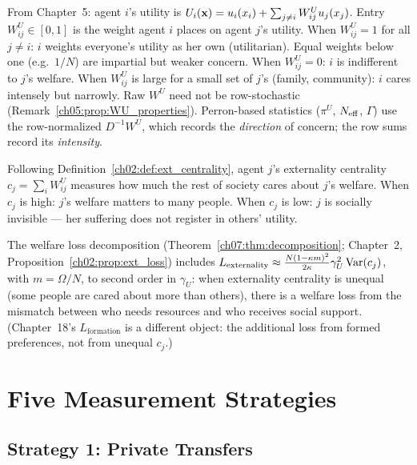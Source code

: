 \documentclass[../structural_economics_book.tex]{subfiles}
\begin{document}
\begin{definition}\label{ch22:def:recall}
From Chapter~5: agent $i$'s utility is $U_i(\mathbf{x}) = u_i(x_i) + \sum_{j \neq i} W^U_{ij} u_j(x_j)$. Entry $W^U_{ij} \in [0, 1]$ is the weight agent $i$ places on agent $j$'s utility. When $W^U_{ij} = 1$ for all $j \ne i$: $i$ weights everyone's utility as her own (utilitarian). Equal weights below one (e.g.\ $1/N$) are impartial but weaker concern. When $W^U_{ij} = 0$: $i$ is indifferent to $j$'s welfare. When $W^U_{ij}$ is large for a small set of $j$'s (family, community): $i$ cares intensely but narrowly. Raw $W^U$ need not be row-stochastic (Remark~\ref{ch05:prop:WU_properties}). Perron-based statistics ($\pi^U$, $N_{\text{eff}}$, $\Gamma$) use the row-normalized $D^{-1}W^U$, which records the \emph{direction} of concern; the row sums record its \emph{intensity}.
\end{definition}

\begin{remark}\label{ch22:prop:externality}
Following Definition~\ref{ch02:def:ext_centrality}, agent $j$'s externality centrality $c_j = \sum_i W^U_{ij}$ measures how much the rest of society cares about $j$'s welfare. When $c_j$ is high: $j$'s welfare matters to many people. When $c_j$ is low: $j$ is socially invisible --- her suffering does not register in others' utility.

The welfare loss decomposition (Theorem~\ref{ch07:thm:decomposition}; Chapter~2, Proposition~\ref{ch02:prop:ext_loss}) includes $L_{\text{externality}} \approx \frac{N(1-\kappa m)^2}{2\kappa}\gamma_U^2\operatorname{Var}(c_j)$, with $m = \Omega/N$, to second order in $\gamma_U$: when externality centrality is unequal (some people are cared about more than others), there is a welfare loss from the mismatch between who needs resources and who receives social support. (Chapter~18's $L_{\text{formation}}$ is a different object: the additional loss from formed preferences, not from unequal $c_j$.)
\end{remark}


\section{Five Measurement Strategies}
\label{ch22:sec:strategies}

\subsection{Strategy 1: Private Transfers}
\end{document}
